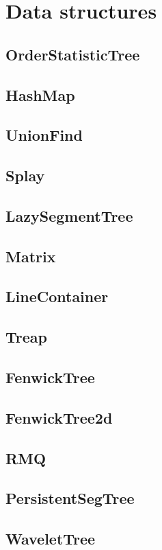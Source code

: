 \chapter{Data structures}

\section{OrderStatisticTree}
\section{HashMap}
\section{UnionFind}
\section{Splay}
\section{LazySegmentTree}
\section{Matrix}
\section{LineContainer}
\section{Treap}
\section{FenwickTree}
\section{FenwickTree2d}
\section{RMQ}
\section{PersistentSegTree}
\section{WaveletTree}

